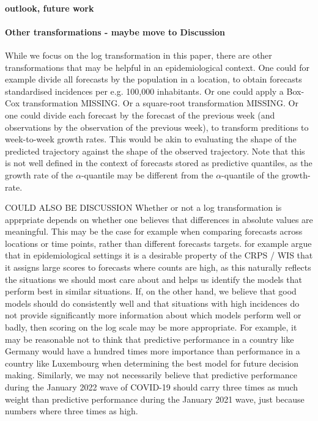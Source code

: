 \documentclass{article}
\begin{document}
\paragraph{outlook, future work}

\paragraph{Other transformations - maybe move to Discussion}
While we focus on the log transformation in this paper, there are other transformations that may be helpful in an epidemiological context. One could for example divide all forecasts by the population in a location, to obtain forecasts standardised incidences per e.g. 100,000 inhabitants. 
Or one could apply a Box-Cox transformation MISSING. 
Or a square-root transformation MISSING. 
Or one could divide each forecast by the forecast of the previous week (and observations by the observation of the previous week), to transform preditions to week-to-week growth rates. This would be akin to evaluating the shape of the predicted trajectory against the shape of the observed trajectory. Note that this is not well defined in the context of forecasts stored as predictive quantiles, as the growth rate of the $\alpha$-quantile may be different from the $\alpha$-quantile of the growth-rate. 



COULD ALSO BE DISCUSSION
Whether or not a log transformation is apprpriate depends on whether one believes that differences in absolute values are meaningful. This may be the case for example when comparing forecasts across locations or time points, rather than different forecasts targets. \cite{bracherEvaluatingEpidemicForecasts2021} for example argue that in epidemiological settings it is a desirable property of the CRPS / WIS that it assigns large scores to forecasts where counts are high, as this naturally reflects the situations we should most care about and helps us identify the models that perform best in similar situations. If, on the other hand, we believe that good models should do consistently well and that situations with high incidences do not provide significantly more information about which models perform well or badly, then scoring on the log scale may be more appropriate. For example, it may be reasonable not to think that predictive performance in a country like Germany would have a hundred times more importance than performance in a country like Luxembourg when determining the best model for future decision making. Similarly, we may not necessarily believe that predictive performance during the January 2022 wave of COVID-19 should carry three times as much weight than predictive performance during the January 2021 wave, just because numbers where three times as high. 
\end{document}
